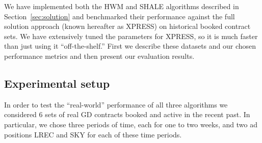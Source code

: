 We have implemented both the HWM and SHALE  algorithms described in
Section~\ref{sec:solution} and benchmarked their performance against
the full solution approach (known hereafter as XPRESS) on
historical booked contract sets. 
We have extensively tuned the parameters for XPRESS, so it is much
faster than just using it ``off-the-shelf.''
First we describe these datasets
and our chosen performance metrics and then present our evaluation
results.

\subsection{Experimental setup}
\label{experimental setup}
In order to test the ``real-world'' performance of all three
algorithms we considered 6 sets of real GD contracts booked and
active in the recent past. In particular, we chose three periods of
time, each for one to two weeks, 
and two ad positions
LREC and SKY for each of these time periods. 


